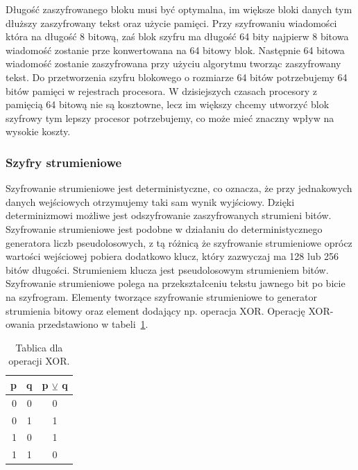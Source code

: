 \documentclass[12p]{article}
\begin{document}
\quad Długość zaszyfrowanego bloku musi być optymalna, im większe bloki danych tym dłuższy zaszyfrowany tekst oraz użycie pamięci. Przy szyfrowaniu wiadomości która na długość 8 bitową, zaś blok szyfru ma długość 64 bity najpierw 8 bitowa wiadomość zostanie prze konwertowana na 64 bitowy blok. Następnie 64 bitowa wiadomość zostanie zaszyfrowana przy użyciu algorytmu tworząc zaszyfrowany tekst. Do przetworzenia szyfru blokowego o rozmiarze 64 bitów potrzebujemy 64 bitów pamięci w rejestrach procesora. W dzisiejszych czasach procesory z pamięcią 64 bitową nie są kosztowne, lecz im większy chcemy utworzyć blok szyfrowy tym lepszy procesor potrzebujemy, co może mieć znaczny wpływ na wysokie koszty.

\subsubsection{Szyfry strumieniowe}
\quad Szyfrowanie strumieniowe jest deterministyczne, co oznacza, że przy jednakowych danych wejściowych otrzymujemy taki sam wynik wyjściowy. Dzięki determinizmowi możliwe jest odszyfrowanie zaszyfrowanych strumieni bitów.  Szyfrowanie strumieniowe jest podobne w działaniu do deterministycznego generatora liczb pseudolosowych, z tą różnicą że szyfrowanie strumieniowe oprócz wartości wejściowej pobiera dodatkowo klucz, który zazwyczaj ma 128 lub 256 bitów długości. Strumieniem klucza jest pseudolosowym strumieniem bitów. Szyfrowanie strumieniowe polega na przekształceniu tekstu jawnego bit po bicie na szyfrogram. Elementy tworzące szyfrowanie strumieniowe to generator strumienia bitowy oraz element dodający np. operacja XOR. Operację XOR-owania przedstawiono w tabeli~\ref{xor}.

\begin{table}[H]
\centering
\begin{tabular}{|r|c|l|}
\hline
p & q & p $\veebar$ q \\
\hline
0 & 0 & \multicolumn{1}{|c|}{0} \\
\hline
0 & 1 & \multicolumn{1}{|c|}{1} \\
\hline
1 & 0 & \multicolumn{1}{|c|}{1} \\
\hline
1 & 1 & \multicolumn{1}{|c|}{0} \\
\hline
\end{tabular}
\caption{Tablica dla operacji XOR.}\label{xor}
\end{table}
\end{document}
